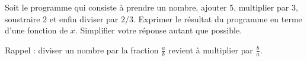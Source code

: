 
\begin{exercice}\label{exoSeconde-0058}

Soit le programme qui consiste à prendre un nombre, ajouter $5$, multiplier par \( 3\), soustraire \( 2\) et enfin diviser par \( 2/3\). Exprimer le résultat du programme en terme d'une fonction de \( x\). Simplifier votre réponse autant que possible.

Rappel : diviser un nombre par la fraction \( \frac{ a }{ b }\) revient à multiplier par \( \frac{ b }{ a }\).

\end{exercice}
